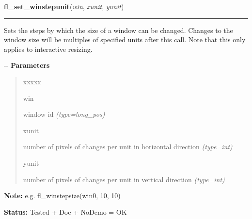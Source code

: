 \hspace{.8\funcindent}\begin{boxedminipage}{\funcwidth}

    \raggedright \textbf{fl\_set\_winstepunit}(\textit{win}, \textit{xunit}, \textit{yunit})

    \vspace{-1.5ex}

    \rule{\textwidth}{0.5\fboxrule}
\setlength{\parskip}{2ex}

Sets the steps by which the size of a window can be changed. Changes
to the window size will be multiples of specified units after this
call. Note that this only applies to interactive resizing.

-{}-
\setlength{\parskip}{1ex}
      \textbf{Parameters}
      \vspace{-1ex}

      \begin{quote}
        \begin{Ventry}{xxxxx}

          \item[win]


window id
            {\it (type=long\_pos)}

          \item[xunit]


number of pixels of changes per unit in horizontal direction
            {\it (type=int)}

          \item[yunit]


number of pixels of changes per unit in vertical direction
            {\it (type=int)}

        \end{Ventry}

      \end{quote}

\textbf{Note:} 
e.g. fl\_winstepsize(win0, 10, 10)


\textbf{Status:} 
Tested + Doc + NoDemo = OK


    \end{boxedminipage}

    \label{xformslib:flxbasic:fl_winisvalid}

    \vspace{0.5ex}


